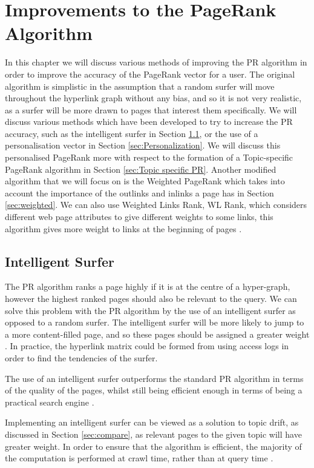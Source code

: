 \documentclass[11pt]{report}
\begin{document}
{\chapter{Improvements to the PageRank Algorithm} \label{chap:Improve}
In this chapter we will discuss various methods of improving the PR algorithm in order to improve the accuracy of the PageRank vector for a user. The original algorithm is simplistic in the assumption that a random surfer will move throughout the hyperlink graph without any bias, and so it is not very realistic, as a surfer will be more drawn to pages that interest them specifically. We will discuss various methods which have been developed to try to increase the PR accuracy, such as the intelligent surfer in Section \ref{sec:intelligent}, or the use of a personalisation vector in Section \ref{sec:Personalization}. We will discuss this personalised PageRank more with respect to the formation of a Topic-specific PageRank algorithm in Section \ref{sec:Topic specific PR}. Another modified algorithm that we will focus on is the Weighted PageRank which takes into account the importance of the outlinks and inlinks a page has \cite{xing2004weighted} in Section \ref{sec:weighted}. We can also use Weighted Links Rank, WL Rank, which considers different web page attributes to give different weights to some links, this algorithm gives more weight to links at the beginning of pages \cite{baeza2004web}.

\section{Intelligent Surfer} \label{sec:intelligent}

The PR algorithm ranks a page highly if it is at the centre of a hyper-graph, however the highest ranked pages should also be relevant to the query. We can solve this problem with the PR algorithm by the use of an intelligent surfer as opposed to a random surfer. The intelligent surfer will be more likely to jump to a more content-filled page, and so these pages should be assigned a greater weight \cite{langville}. In practice, the hyperlink matrix could be formed from using access logs in order to find the tendencies of the surfer. 

The use of an intelligent surfer outperforms the standard PR algorithm in terms of the quality of the pages, whilst still being efficient enough in terms of being a practical search engine \cite{richardson2002intelligent}. 

Implementing an intelligent surfer can be viewed as a solution to topic drift, as discussed in Section \ref{sec:compare}, as relevant pages to the given topic will have greater weight. In order to ensure that the algorithm is efficient, the majority of the computation is performed at crawl time, rather than at query time \cite{richardson2002intelligent}. 

}
\end{document}
